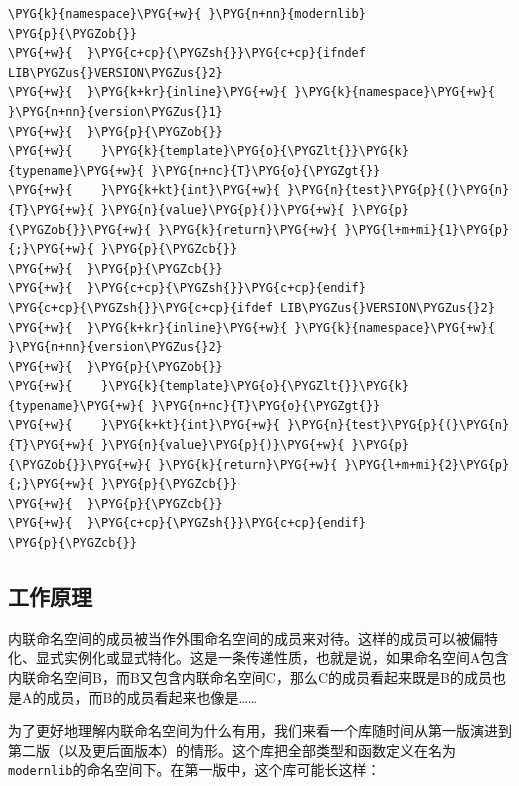 \begin{codeblockbg}
\begin{Verbatim}[commandchars=\\\{\},breaklines=true,breakanywhere=true,fontsize=\codefont,xleftmargin=17bp]
\PYG{k}{namespace}\PYG{+w}{ }\PYG{n+nn}{modernlib}
\PYG{p}{\PYGZob{}}
\PYG{+w}{  }\PYG{c+cp}{\PYGZsh{}}\PYG{c+cp}{ifndef LIB\PYGZus{}VERSION\PYGZus{}2}
\PYG{+w}{  }\PYG{k+kr}{inline}\PYG{+w}{ }\PYG{k}{namespace}\PYG{+w}{ }\PYG{n+nn}{version\PYGZus{}1}
\PYG{+w}{  }\PYG{p}{\PYGZob{}}
\PYG{+w}{    }\PYG{k}{template}\PYG{o}{\PYGZlt{}}\PYG{k}{typename}\PYG{+w}{ }\PYG{n+nc}{T}\PYG{o}{\PYGZgt{}}
\PYG{+w}{    }\PYG{k+kt}{int}\PYG{+w}{ }\PYG{n}{test}\PYG{p}{(}\PYG{n}{T}\PYG{+w}{ }\PYG{n}{value}\PYG{p}{)}\PYG{+w}{ }\PYG{p}{\PYGZob{}}\PYG{+w}{ }\PYG{k}{return}\PYG{+w}{ }\PYG{l+m+mi}{1}\PYG{p}{;}\PYG{+w}{ }\PYG{p}{\PYGZcb{}}
\PYG{+w}{  }\PYG{p}{\PYGZcb{}}
\PYG{+w}{  }\PYG{c+cp}{\PYGZsh{}}\PYG{c+cp}{endif}
\PYG{c+cp}{\PYGZsh{}}\PYG{c+cp}{ifdef LIB\PYGZus{}VERSION\PYGZus{}2}
\PYG{+w}{  }\PYG{k+kr}{inline}\PYG{+w}{ }\PYG{k}{namespace}\PYG{+w}{ }\PYG{n+nn}{version\PYGZus{}2}
\PYG{+w}{  }\PYG{p}{\PYGZob{}}
\PYG{+w}{    }\PYG{k}{template}\PYG{o}{\PYGZlt{}}\PYG{k}{typename}\PYG{+w}{ }\PYG{n+nc}{T}\PYG{o}{\PYGZgt{}}
\PYG{+w}{    }\PYG{k+kt}{int}\PYG{+w}{ }\PYG{n}{test}\PYG{p}{(}\PYG{n}{T}\PYG{+w}{ }\PYG{n}{value}\PYG{p}{)}\PYG{+w}{ }\PYG{p}{\PYGZob{}}\PYG{+w}{ }\PYG{k}{return}\PYG{+w}{ }\PYG{l+m+mi}{2}\PYG{p}{;}\PYG{+w}{ }\PYG{p}{\PYGZcb{}}
\PYG{+w}{  }\PYG{p}{\PYGZcb{}}
\PYG{+w}{  }\PYG{c+cp}{\PYGZsh{}}\PYG{c+cp}{endif}
\PYG{p}{\PYGZcb{}}
\end{Verbatim}
\end{codeblockbg}



\subsection{工作原理}



内联命名空间的成员被当作外围命名空间的成员来对待。这样的成员可以被偏特化、显式实例化或显式特化。这是一条传递性质，也就是说，如果命名空间A包含内联命名空间B，而B又包含内联命名空间C，那么C的成员看起来既是B的成员也是A的成员，而B的成员看起来也像是……



为了更好地理解内联命名空间为什么有用，我们来看一个库随时间从第一版演进到第二版（以及更后面版本）的情形。这个库把全部类型和函数定义在名为\texttt{modernlib}的命名空间下。在第一版中，这个库可能长这样：


